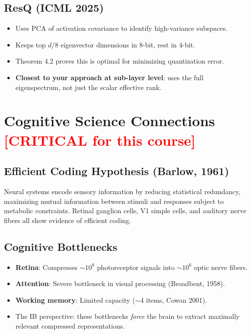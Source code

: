 \documentclass[11pt,a4paper]{article}
\begin{document}
\subsection{ResQ (ICML 2025) \cite{resq2025}}
\begin{itemize}
    \item Uses PCA of activation covariance to identify high-variance subspaces.
    \item Keeps top $d/8$ eigenvector dimensions in 8-bit, rest in 4-bit.
    \item Theorem 4.2 proves this is optimal for minimizing quantization error.
    \item \textbf{Closest to your approach at sub-layer level}: uses the full eigenspectrum, not just the scalar effective rank.
\end{itemize}

\section{Cognitive Science Connections \textnormal{\textcolor{red}{[CRITICAL for this course]}}}

\subsection{Efficient Coding Hypothesis (Barlow, 1961) \cite{barlow1961possible}}
Neural systems encode sensory information by reducing statistical redundancy, maximizing mutual information between stimuli and responses subject to metabolic constraints. Retinal ganglion cells, V1 simple cells, and auditory nerve fibers all show evidence of efficient coding.

\subsection{Cognitive Bottlenecks}
\begin{itemize}
    \item \textbf{Retina}: Compresses $\sim 10^8$ photoreceptor signals into $\sim 10^6$ optic nerve fibers.
    \item \textbf{Attention}: Severe bottleneck in visual processing (Broadbent, 1958).
    \item \textbf{Working memory}: Limited capacity ($\sim$4 items, Cowan 2001).
    \item The IB perspective: these bottlenecks \emph{force} the brain to extract maximally relevant compressed representations.
\end{itemize}
\end{document}
